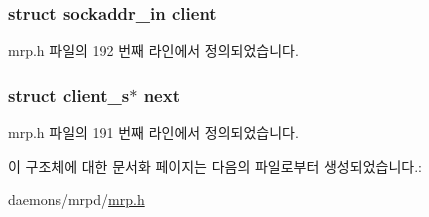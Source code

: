\subsubsection[{\texorpdfstring{client}{client}}]{\setlength{\rightskip}{0pt plus 5cm}struct sockaddr\+\_\+in client}\hypertarget{structclient__s_abf7df3c8f5ff035f1843f41668a2168c}{}\label{structclient__s_abf7df3c8f5ff035f1843f41668a2168c}


mrp.\+h 파일의 192 번째 라인에서 정의되었습니다.

\subsubsection[{\texorpdfstring{next}{next}}]{\setlength{\rightskip}{0pt plus 5cm}struct {\bf client\+\_\+s}$\ast$ next}\hypertarget{structclient__s_af3acd6523ace0fc96b77f04cf1b88d06}{}\label{structclient__s_af3acd6523ace0fc96b77f04cf1b88d06}


mrp.\+h 파일의 191 번째 라인에서 정의되었습니다.



이 구조체에 대한 문서화 페이지는 다음의 파일로부터 생성되었습니다.\+:\begin{DoxyCompactItemize}
\item 
daemons/mrpd/\hyperlink{mrp_8h}{mrp.\+h}\end{DoxyCompactItemize}

